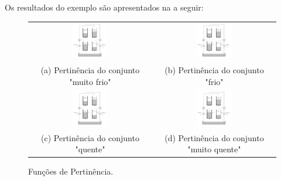 Os resultados do exemplo são apresentados na  a seguir:
\begin{figure}[H]
	\centering
	\begin{tabular}{cc}
		\includegraphics[width=0.3\textwidth,keepaspectratio]{img/4tank.png} &
		\includegraphics[width=0.3\textwidth,keepaspectratio]{img/4tank.png} \\
		(a) Pertinência do conjunto "muito frio" &
		(b) Pertinência do conjunto "frio" \\
		\includegraphics[width=0.3\textwidth,keepaspectratio]{img/4tank.png} &
		\includegraphics[width=0.3\textwidth,keepaspectratio]{img/4tank.png} \\
		(c) Pertinência do conjunto "quente" &
		(d) Pertinência do conjunto "muito quente"
	\end{tabular}
	\caption{\label{figPertEx} Funções de Pertinência.}
\end{figure}	

